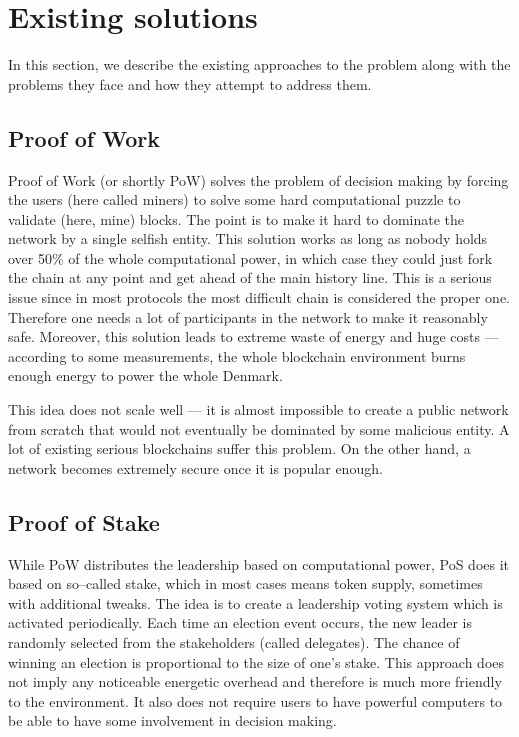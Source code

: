 \section{Existing solutions}

In this section, we describe the existing approaches to the problem along
with the problems they face and how they attempt to address them.

\subsection{Proof of Work}

Proof of Work (or shortly PoW) solves the problem of decision making by forcing the
users (here called miners) to solve some hard computational puzzle to validate
(here, mine) blocks\cite{bitcoin}.
The point is to make it hard to dominate the network by a
single selfish entity. This solution works as long as nobody holds over 50\% of the whole
computational power, in which case they could just fork the chain at any point
and get ahead of the main history line. This is a serious issue since in most
protocols the most difficult chain is considered the proper one. Therefore one needs a
lot of participants in the network to make it reasonably safe. Moreover, this
solution leads to extreme waste of energy and huge costs — according to some
measurements, the whole blockchain environment burns enough energy to power
the whole Denmark\cite{bitcoin_energy}.

This idea does not scale well — it is almost impossible to create a public
network from scratch that would not eventually be dominated by some malicious
entity. A lot of existing serious blockchains suffer this
problem\cite{51attack}. On the other hand, a network becomes extremely secure once
it is popular enough.

\subsection{Proof of Stake}

While PoW distributes the leadership based on computational power, PoS does it
based on so–called stake, which in most cases means token supply, sometimes
with additional tweaks\cite{peercoin}\cite{cryptocurr_without_pow}.
The idea is to create a leadership voting system
which is activated periodically. Each time an election event occurs,
the new leader is randomly selected from the stakeholders (called delegates).
The chance of winning an election is proportional to the size of one's stake.
This approach does
not imply any noticeable energetic overhead and therefore is much more friendly to the
environment. It also does not require users to have powerful computers to be able to
have some involvement in decision making.

